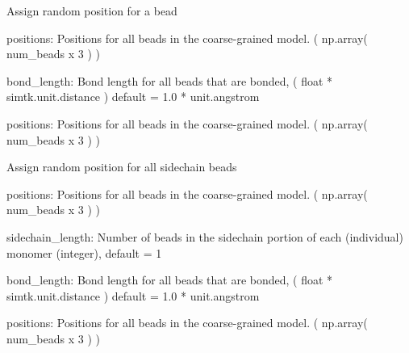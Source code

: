 \documentclass[letterpaper,12pt,english,openany,twoside]{sphinxmanual}
\begin{document}

\begin{fulllineitems}
\label{\detokenize{util:util.assign_position}}
Assign random position for a bead

positions: Positions for all beads in the coarse-grained model.
( np.array( num\_beads x 3 ) )

bond\_length: Bond length for all beads that are bonded,
( float * simtk.unit.distance )
default = 1.0 * unit.angstrom

positions: Positions for all beads in the coarse-grained model.
( np.array( num\_beads x 3 ) )

\end{fulllineitems}


\begin{fulllineitems}
\label{\detokenize{util:util.assign_sidechain_beads}}
Assign random position for all sidechain beads

positions: Positions for all beads in the coarse-grained model.
( np.array( num\_beads x 3 ) )

sidechain\_length: Number of beads in the sidechain
portion of each (individual) monomer (integer), default = 1

bond\_length: Bond length for all beads that are bonded,
( float * simtk.unit.distance )
default = 1.0 * unit.angstrom

positions: Positions for all beads in the coarse-grained model.
( np.array( num\_beads x 3 ) )

\end{fulllineitems}

\end{document}
